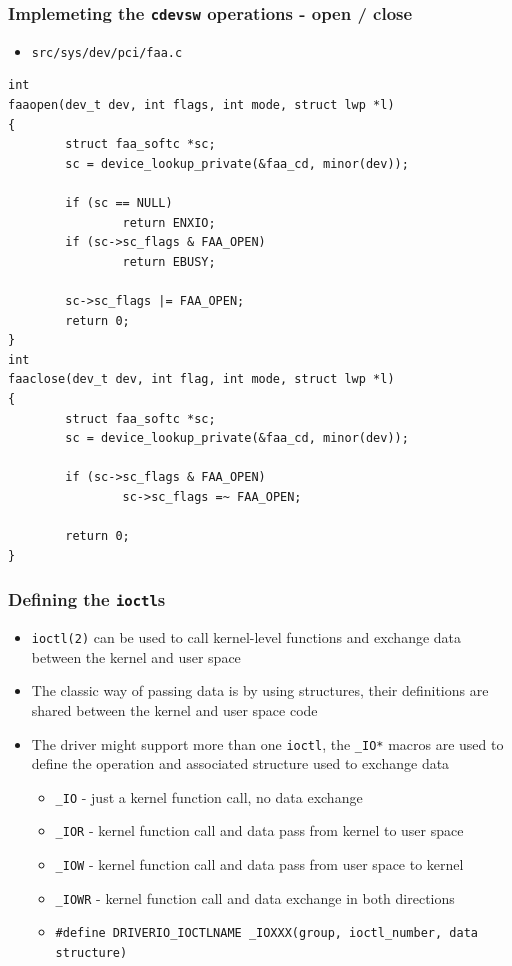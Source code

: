 \documentclass[dvipsnames,table]{beamer}
\begin{document}
\begin{frame}[fragile]
\frametitle{Implemeting the {\tt cdevsw} operations - open / close}
\begin{itemize}
	\item {\tt src/sys/dev/pci/faa.c}
\end{itemize}
\begin{lstlisting}
int
faaopen(dev_t dev, int flags, int mode, struct lwp *l)
{
        struct faa_softc *sc;
        sc = device_lookup_private(&faa_cd, minor(dev));

        if (sc == NULL)
                return ENXIO;
        if (sc->sc_flags & FAA_OPEN)
                return EBUSY;

        sc->sc_flags |= FAA_OPEN;
        return 0;
}
int
faaclose(dev_t dev, int flag, int mode, struct lwp *l)
{
        struct faa_softc *sc;
        sc = device_lookup_private(&faa_cd, minor(dev));

        if (sc->sc_flags & FAA_OPEN)
                sc->sc_flags =~ FAA_OPEN;

        return 0;
}
\end{lstlisting}
\end{frame}

\begin{frame}
\frametitle{Defining the {\tt ioctl}s}
\begin{itemize}
	\item {\tt ioctl(2)} can be used to call kernel-level functions and exchange data between the kernel and user space
	\item The classic way of passing data is by using structures, their definitions are shared between the kernel and user space code
	\item The driver might support more than one {\tt ioctl}, the {\tt \_IO*} macros are used to define the operation and associated structure used to exchange data
	\begin{itemize}
		\item {\tt \_IO} - just a kernel function call, no data exchange
		\item {\tt \_IOR} - kernel function call and data pass from kernel to user space
		\item {\tt \_IOW} - kernel function call and data pass from user space to kernel
		\item {\tt \_IOWR} - kernel function call and data exchange in both directions
		\item {\tt \#define DRIVERIO\_IOCTLNAME	\_IOXXX(group, ioctl\_number, data structure)}
	\end{itemize}
\end{itemize}

\end{frame}
\end{document}
